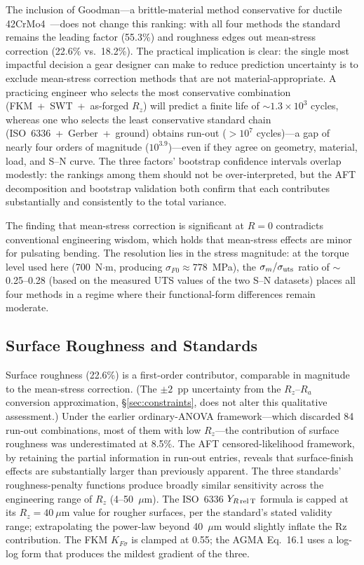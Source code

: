 \documentclass[twocolumn,12pt,a4paper]{article}
\begin{document}
The inclusion of Goodman---a brittle-material method conservative for
ductile 42CrMo4~\cite{stephens2001}---does not change this ranking:
with all four methods the standard remains the leading factor (55.3\%)
and roughness edges out mean-stress correction (22.6\% vs.\ 18.2\%).
The practical
implication is clear: the single most impactful decision a gear
designer can make
to reduce prediction uncertainty is to exclude mean-stress correction
methods that are not material-appropriate. A practicing engineer who selects the most conservative
combination
(FKM~+~SWT~+~as-forged $R_z$) will predict a finite life of
$\sim$$1.3\times10^{3}$ cycles, whereas one who selects the least
conservative standard chain (ISO~6336~+~Gerber~+~ground) obtains
run-out ($>10^7$ cycles)---a gap of nearly four orders of
magnitude ($10^{3.9}$)---even if they agree on geometry, material,
load, and S--N curve. The three factors' bootstrap confidence intervals
overlap modestly: the rankings among them should not be over-interpreted,
but the AFT decomposition and bootstrap validation both confirm that each
contributes substantially and consistently to the total variance.

The finding that mean-stress correction is significant at $R=0$
contradicts conventional engineering wisdom, which holds that
mean-stress effects are minor for pulsating bending. The resolution lies
in the stress magnitude: at the torque level used here (700~N$\cdot$m,
producing $\sigma_{F0} \approx 778$~MPa), the $\sigma_m/\sigma_{\rm uts}$
ratio of $\sim$0.25--0.28 (based on the measured UTS values of the two
S--N datasets) places all four methods in a regime where their
functional-form differences remain moderate.

\subsection{Surface Roughness and Standards}

Surface roughness (22.6\%) is a first-order contributor, comparable in
magnitude to the mean-stress correction. (The $\pm 2$~pp uncertainty
from the $R_z$--$R_a$ conversion approximation,
\S\ref{sec:constraints}, does not alter this qualitative assessment.)
Under the earlier ordinary-ANOVA
framework---which discarded 84 run-out combinations, most of them with
low $R_z$---the contribution of surface roughness was underestimated at
8.5\%. The AFT censored-likelihood framework, by retaining the partial
information in run-out entries, reveals that surface-finish effects are
substantially larger than previously apparent. The three standards'
roughness-penalty functions produce broadly similar sensitivity across
the engineering range of $R_z$ (4--50~$\mu$m). The ISO~6336
$Y_{R\,\rm rel\,T}$ formula is capped at its $R_z=40~\mu$m value for
rougher surfaces, per the standard's stated validity range; extrapolating
the power-law beyond 40~$\mu$m would slightly inflate the Rz contribution.
The FKM $K_{F\sigma}$ is clamped at 0.55; the AGMA Eq.~16.1 uses a
log-log form that produces the mildest gradient of the three.
\end{document}
